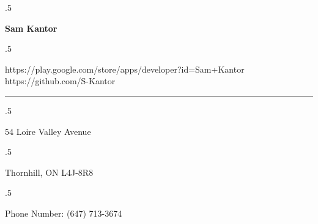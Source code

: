 \documentclass[margin]{res}
\begin{document}
 \moveleft.5\hoffset\centerline{\Huge\bf Sam Kantor}
 \moveleft.5\hoffset\centerline{}
 \begin{changemargin}{-3.1cm}{0.5cm} 
 {https://play.google.com/store/apps/developer?id=Sam+Kantor \hspace{43 pt} https://github.com/S-Kantor}
  \end{changemargin}
\begin{changemargin}{-3.4cm}{2.5cm} 
 {\noindent\rule{17cm}{0.5pt} }\smallskip
 \end{changemargin}

 \moveleft.5\hoffset\centerline{54 Loire Valley Avenue}
 \moveleft.5\hoffset\centerline{Thornhill, ON L4J-8R8}
 \moveleft.5\hoffset\centerline{Phone Number: (647) 713-3674}
\end{document}
